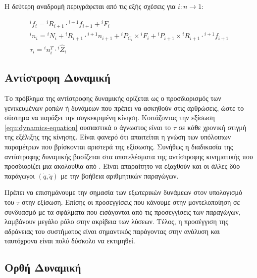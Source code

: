 Η δεύτερη αναδρομή περιγράφεται από τις εξής σχέσεις για $i : n \rightarrow 1$:

\begin{equation}
    \begin{aligned}
        ^if_i = {}^{i}R_{i+1} \cdot {}^{i+1}f_{i+1} + {}^iF_i\\[10pt]
        ^in_i = {}^iN_i + {}^iR_{i+1} \cdot {}^{i+1}n_{i+1} + {}^iP_{C_i} \times
        {}^iF_i + {}^iP_{i+1} \times {}^iR_{i+1} \cdot {}^{i+1}f_{i+1}\\[10pt]
        \tau_i = {}^in^T_i \cdot {}^i\hat{Z}_i
    \end{aligned}
    \label{equ:iterative-NE-second}
\end{equation}

\subsection{Αντίστροφη Δυναμική}

Το πρόβλημα της αντίστροφης δυναμικής ορίζεται ως ο προσδιορισμός των γενικευμένων ροπών ή δυνάμεων που πρέπει να ασκηθούν στις αρθρώσεις, ώστε το σύστημα να παράξει την συγκεκριμένη κίνηση. Κοιτάζοντας την εξίσωση \ref{equ:dynamics-equation} ουσιαστικά ο άγνωστος είναι το $\tau $ σε κάθε χρονική στιγμή της εξέλιξης της κίνησης. Είναι φανερό ότι απαιτείται η γνώση των υπόλοιπων παραμέτρων που βρίσκονται αριστερά της εξίσωσης. Συνήθως η διαδικασία της αντίστροφης δυναμικής βασίζεται στα αποτελέσματα της αντίστροφης κινηματικής που προσδιορίζει μια ακολουθία από . Είναι απαραίτητο να εξαχθούν και οι άλλες δύο παράγωγοι $(\dot{q}, \ddot{q})$ με την βοήθεια αριθμητικών παραγώγων.

Πρέπει να επισημάνουμε την σημασία των εξωτερικών δυνάμεων στον υπολογισμό του $\tau $ στην εξίσωση. Επίσης οι προσεγγίσεις που κάνουμε στην μοντελοποίηση σε συνδυασμό με τα σφάλματα που εισάγονται από τις προσεγγίσεις των παραγώγων, λαμβάνουν μεγάλο ρόλο στην ακρίβεια των λύσεων. Τέλος, η προσέγγιση της αδράνειας του συστήματος είναι σημαντικός παράγοντας στην ανάλυση και ταυτόχρονα είναι πολύ δύσκολο να εκτιμηθεί.

\subsection{Ορθή Δυναμική}

